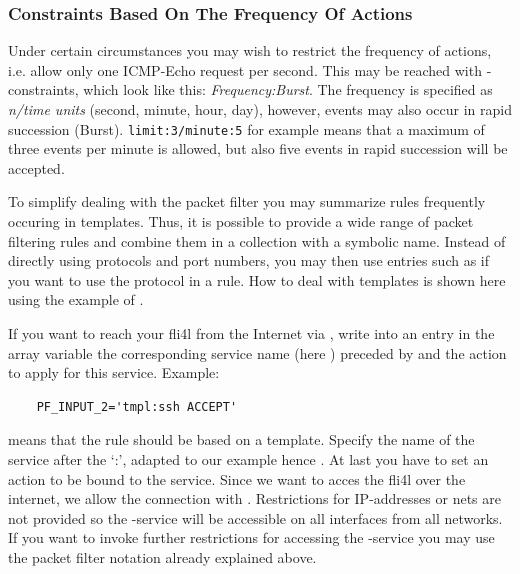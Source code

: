 \subsubsection{Constraints Based On The Frequency Of Actions}

Under certain circumstances you may wish to restrict the frequency of
actions, i.e. allow only one ICMP-Echo request per second. This may be
reached with -constraints, which look like this:
\emph{Frequency:Burst}. The frequency is specified as
\emph{n/time units} (second, minute, hour, day), however, events may also occur
in rapid succession (Burst). \texttt{limit:3/minute:5} for example means
that a maximum of three events per minute is allowed, but also five events
in rapid succession will be accepted.


To simplify dealing with the packet filter you may summarize rules frequently
occuring in templates. Thus, it is possible to provide a wide range of
packet filtering rules and combine them in a collection with a symbolic
name. Instead of directly using protocols and port numbers, you may then
use entries such as  if you want to use the 
protocol in a rule. How to deal with templates is shown here using the
example of .

If you want to reach your fli4l from the Internet via ,
write into an entry in the array variable  the
corresponding service name (here ) preceded by
 and the action to apply for this service. Example:

\begin{example}
\begin{verbatim}
    PF_INPUT_2='tmpl:ssh ACCEPT'
\end{verbatim}
\end{example}

 means that the rule should be based on a template. Specify the
name of the service after the `:', adapted to our example hence .
At last you have to set an action to be bound to the service. Since we want to
acces the fli4l over the internet, we allow the connection with .
Restrictions for IP-addresses or nets are not provided so the -service
will be accessible on all interfaces from all networks. If you want to invoke further
restrictions for accessing the -service you may use the packet filter
notation already explained above.

